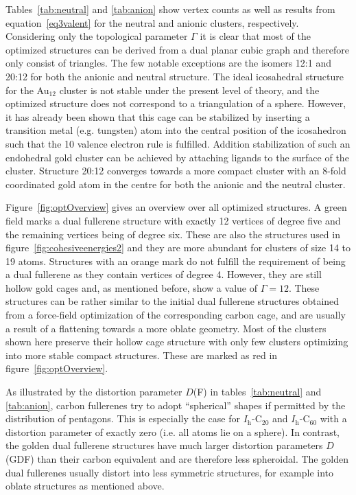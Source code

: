 Tables~\ref{tab:neutral} and \ref{tab:anion} show vertex counts as well as
results from equation~\eqref{eq3valent} for the neutral and anionic clusters,
respectively. Considering only the topological parameter $\Gamma$ it is clear
that most of the optimized structures can be derived from a dual planar cubic
graph and therefore only consist of triangles. The few notable exceptions are
the isomers 12:1 and 20:12 for both the anionic and neutral structure. The
ideal icosahedral structure for the Au$_{12}$ cluster is not stable under the
present level of theory, and the optimized structure does not correspond to a
triangulation of a sphere. However, it has already been shown that this cage
can be stabilized by inserting a transition metal (e.g. tungsten) atom into the
central position of the icosahedron such that the 10 valence electron rule is
fulfilled.\autocite{Pyykko_IcosahedralWAu12Predicted_2002,Autschbach_PropertiesWAu12_2004}
Addition stabilization of such an endohedral gold cluster can be achieved by
attaching ligands to the surface of the cluster.\autocite{Laupp-1994} Structure
20:12 converges towards a more compact cluster with an 8-fold coordinated gold
atom in the centre for both the anionic and the neutral cluster.  

Figure~\ref{fig:optOverview} gives an overview over all optimized structures.
A green field marks a dual fullerene structure with exactly 12 vertices of
degree five and the remaining vertices being of degree six. These are also the
structures used in figure~\ref{fig:cohesiveenergies2} and they are more
abundant for clusters of size 14 to 19 atoms. Structures with an orange mark do
not fulfill the requirement of being a dual fullerene as they contain vertices
of degree 4. However, they are still hollow gold cages and, as mentioned
before, show a value of $\Gamma=12$. These structures can be rather similar to
the initial dual fullerene structures obtained from a force-field optimization
of the corresponding carbon cage, and are usually a result of a flattening
towards a more oblate geometry.  Most of the clusters shown here preserve their
hollow cage structure with only few clusters optimizing into more stable
compact structures. These are marked as red in figure~\ref{fig:optOverview}.


As illustrated by the distortion parameter $D$(F) in tables~\ref{tab:neutral}
and \ref{tab:anion}, carbon fullerenes try to adopt ``spherical'' shapes if
permitted by the distribution of pentagons. This is especially the case for
$I_\mathrm{h}$-C$_{20}$ and $I_\mathrm{h}$-C$_{60}$ with a distortion parameter
of exactly zero (i.e. all atoms lie on a sphere).  In contrast, the golden dual
fullerene structures have much larger distortion parameters $D$(GDF) than their
carbon equivalent and are therefore less spheroidal. The golden dual fullerenes
usually distort into less symmetric structures, for example into oblate
structures as mentioned above.

